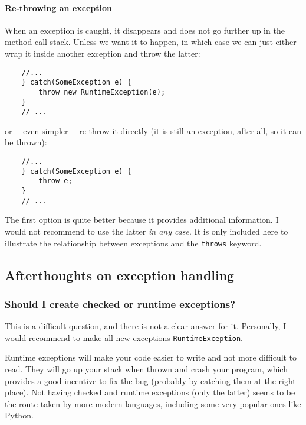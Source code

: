 \paragraph{Re-throwing an exception}
\label{sec:re-throwing-an}

When an exception is caught, it disappears and does not go further up
in the method call stack. Unless we want it to happen, in which case
we can just either wrap it inside another exception and throw the
latter: 

\begin{verbatim}
    //...
    } catch(SomeException e) {
        throw new RuntimeException(e);
    }
    // ...
\end{verbatim}

or ---even simpler--- re-throw it directly (it is still an exception,
after all, so it can be thrown): 

\begin{verbatim}
    //...
    } catch(SomeException e) {
        throw e;
    }
    // ...
\end{verbatim}

The first option is quite better because it provides additional
information. I would not recommend to use the latter \emph{in any
  case}. It is only included here to illustrate the
relationship between exceptions and the \verb+throws+ keyword.

\subsection{Afterthoughts on exception handling}
\label{sec:afterth-except-handl}

\subsubsection{Should I create checked or runtime exceptions?}
\label{sec:should-i-create}

This is a difficult question, and there is not a clear answer for
it. Personally, I would recommend to make all new exceptions
\verb+RuntimeException+. 

Runtime exceptions will make your code easier to write
and not more difficult to read. They will go up your stack when thrown
and crash your program, which provides a good incentive to fix
the bug (probably by catching them at the right place). 
Not having checked and runtime exceptions (only the latter) seems
to be the route taken by more modern languages, including some very
popular ones like Python.


